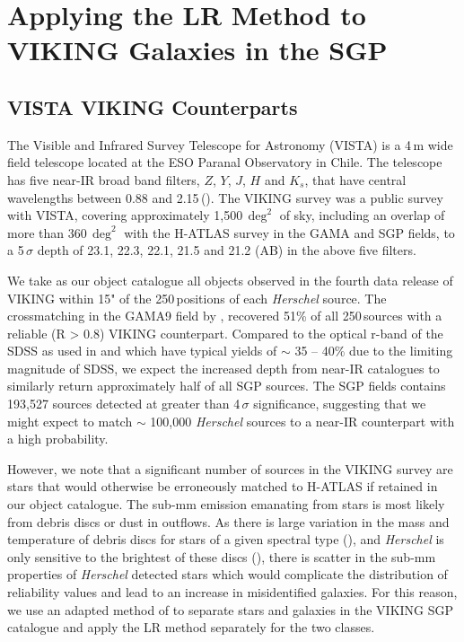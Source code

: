\section{Applying the LR Method to VIKING Galaxies in the SGP}
\subsection{VISTA VIKING Counterparts}
\label{sec:star_galaxy_classifier}

The Visible and Infrared Survey Telescope for Astronomy (VISTA) is a 4\,m wide field telescope located at the ESO Paranal Observatory in Chile. The telescope has five near-IR broad band filters, $Z$, $Y$, $J$, $H$ and $K_s$, that have central wavelengths between 0.88 and 2.15\,\micron (\citealt{Emerson_2010}). The VIKING survey was a public survey with VISTA, covering approximately 1,500\,$\deg^{2}$ of sky, including an overlap of more than 360\,$\deg^{2}$ with the H-ATLAS survey in the GAMA and SGP fields, to a 5\,$\sigma$ depth of 23.1, 22.3, 22.1, 21.5 and 21.2 (AB) in the above five filters.

We take as our object catalogue all objects observed in the fourth data release of VIKING within 15" of the 250\,\micron positions of each \textit{Herschel} source. The crossmatching in the GAMA9 field by \citealt{Fleuren_2012}, recovered 51\% of all 250\,\micron sources with a reliable (R > 0.8) VIKING counterpart. Compared to the optical r-band of the SDSS as used in \citealt{Bourne_2016} and \citealt{Furlanetto_2018} which have typical yields of $\sim$ 35 -- 40\% due to the limiting magnitude of SDSS, we expect the increased depth from near-IR catalogues to similarly return approximately half of all SGP sources. The SGP fields contains 193,527 sources detected at greater than 4\,$\sigma$ significance, suggesting that we might expect to match $\sim$ 100,000 \textit{Herschel} sources to a near-IR counterpart with a high probability.

However, we note that a significant number of sources in the VIKING survey are stars that would otherwise be erroneously matched to H-ATLAS if retained in our object catalogue. The sub-mm emission emanating from stars is most likely from debris discs or dust in outflows. As there is large variation in the mass and temperature of debris discs for stars of a given spectral type (\citealt{Hillenbrand_2008}), and \textit{Herschel} is only sensitive to the brightest of these discs (\citealt{Thompson_2010}), there is scatter in the sub-mm properties of \textit{Herschel} detected stars which would complicate the distribution of reliability values and lead to an increase in misidentified galaxies. For this reason, we use an adapted method of \citealt{Baldry_2010} to separate stars and galaxies in the VIKING SGP catalogue and apply the LR method separately for the two classes.

